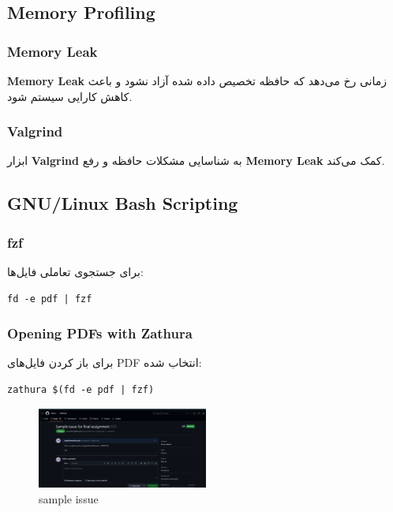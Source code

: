 \documentclass{article}
\begin{document}
\subsection{Memory Profiling}
\subsubsection{Memory Leak}
\textbf{Memory Leak} زمانی رخ می‌دهد که حافظه تخصیص داده شده آزاد نشود و باعث کاهش کارایی سیستم شود.

\subsubsection{Valgrind}
ابزار \textbf{Valgrind} به شناسایی مشکلات حافظه و رفع \textbf{Memory Leak} کمک می‌کند.
\subsection{GNU/Linux Bash Scripting}
\subsubsection{fzf}
برای جستجوی تعاملی فایل‌ها:
\begin{verbatim}
fd -e pdf | fzf
\end{verbatim}

\subsubsection{Opening PDFs with Zathura}
برای باز کردن فایل‌های PDF انتخاب شده:
\begin{verbatim}
zathura $(fd -e pdf | fzf)
\end{verbatim}
\begin{figure}[h!]
    \centering
    \includegraphics[width=0.5\textwidth]{assets/Screenshot 2025-01-15 233322.png}
    \caption{sample issue}
    \label{fig:example}
\end{figure}
\end{document}
